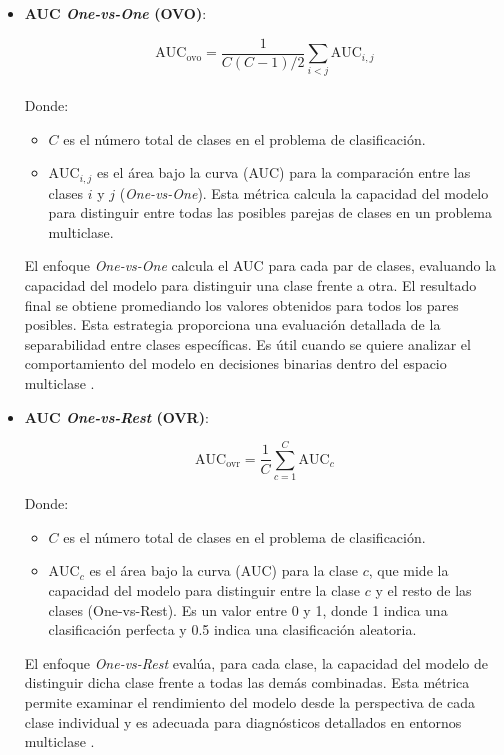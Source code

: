 \begin{itemize}

\item \textbf{AUC \textit{One-vs-One} (OVO)}:

\begin{equation}
\text{AUC}_{\text{ovo}} = \frac{1}{C(C-1)/2} \sum_{i<j} \text{AUC}_{i,j}
\end{equation}\\

Donde:
\begin{itemize}
    \item \( C \) es el número total de clases en el problema de clasificación.
    \item \( \text{AUC}_{i,j} \) es el área bajo la curva (AUC) para la comparación entre las clases \( i \) y \( j \) (\textit{One-vs-One}). Esta métrica calcula la capacidad del modelo para distinguir entre todas las posibles parejas de clases en un problema multiclase.
\end{itemize}

El enfoque \textit{One-vs-One} calcula el AUC para cada par de clases, evaluando la capacidad del modelo para distinguir una clase frente a otra. El resultado final se obtiene promediando los valores obtenidos para todos los pares posibles. Esta estrategia proporciona una evaluación detallada de la separabilidad entre clases específicas. Es útil cuando se quiere analizar el comportamiento del modelo en decisiones binarias dentro del espacio multiclase \cite{Hsu2002}.

\item \textbf{AUC \textit{One-vs-Rest} (OVR)}:

\begin{equation}
\text{AUC}_{\text{ovr}} = \frac{1}{C} \sum_{c=1}^{C} \text{AUC}_c
\end{equation}

Donde:
\begin{itemize}
    \item \( C \) es el número total de clases en el problema de clasificación.
    \item \( \text{AUC}_c \) es el área bajo la curva (AUC) para la clase \( c \), que mide la capacidad del modelo para distinguir entre la clase \( c \) y el resto de las clases (One-vs-Rest). Es un valor entre 0 y 1, donde 1 indica una clasificación perfecta y 0.5 indica una clasificación aleatoria.
\end{itemize}


El enfoque \textit{One-vs-Rest} evalúa, para cada clase, la capacidad del modelo de distinguir dicha clase frente a todas las demás combinadas. Esta métrica permite examinar el rendimiento del modelo desde la perspectiva de cada clase individual y es adecuada para diagnósticos detallados en entornos multiclase \cite{Rifkin2004}.

\end{itemize}


